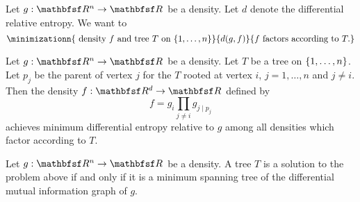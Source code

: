 
Let $g: \R^n \to \R$ be a density.
Let $d$ denote the differential
relative entropy.
We want to
\[
  \minimizationn{
    \text{ density } f \text{ and tree } T \text{ on } \set{1, \dots, n}
  }{
    d(g, f)
  }{
    f \text{ factors according to } T.
  }
\]


\begin{prop}
  Let $g: \R^n \to \R$ be a density.
  Let $T$ be
  a tree on $\{1, \dots, n\}$.
  Let $p_j$ be
  the parent of vertex $j$ for the $T$ rooted
  at vertex $i$, $j = 1,\dots,n$ and $j \neq i$.
  Then the density $f: \R^d \to \R$ defined by
  \[
    f = g_i \prod_{j \neq i} g_{j \mid p_j}
  \]
  achieves minimum differential entropy relative to $g$ among
  all densities which factor according to $T$.
\end{prop}

\begin{prop}
  Let $g: \R^n \to \R$ be a density.
  A tree $T$ is a solution to the problem above
  if and only if it is a minimum spanning
  tree of the differential mutual information graph of $g$.
\end{prop}
\strats
